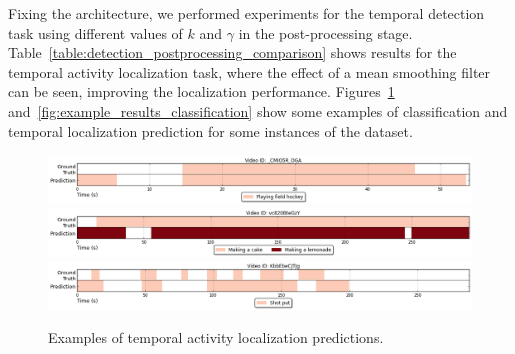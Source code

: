 \documentclass{article}
\begin{document}
Fixing the architecture, we performed experiments for the temporal detection task using different values of $k$ and $\gamma$ in the post-processing stage.
Table~\ref{table:detection_postprocessing_comparison} shows results for the temporal activity localization task, where the effect of a mean smoothing filter can be seen, improving the localization performance.
Figures~\ref{fig:example_results_detect} and~\ref{fig:example_results_classification} show some examples of classification and temporal localization prediction for some instances of the dataset.
\begin{figure}[ht]
\centering
\includegraphics[width=1\linewidth]{img/activity_temporal_localization_8.png}
\includegraphics[width=1\linewidth]{img/activity_temporal_localization_55.png}
\includegraphics[width=1\linewidth]{img/activity_temporal_localization_20.png}
\caption{Examples of temporal activity localization predictions.}
\label{fig:example_results_detect}
\end{figure}
\end{document}
